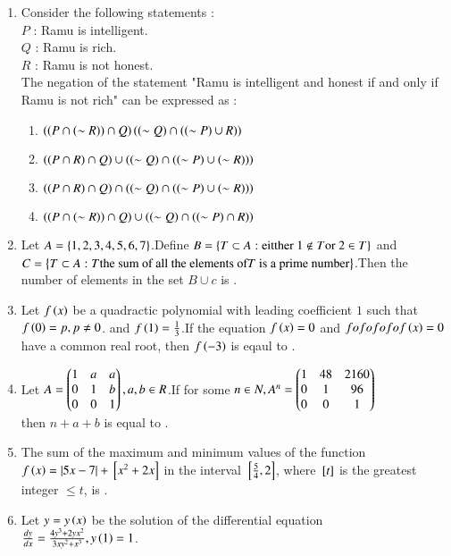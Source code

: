 \documentclass[journal,12pt,onecolumn,article]{IEEEtran}
\theoremstyle{remark}
\begin{document}
\begin{enumerate}
\item Consider the following statements : \\
$P$ : Ramu is intelligent. \\
$Q$ : Ramu is rich. \\
$R$ : Ramu is not honest.\\
The negation of the statement "Ramu is intelligent and honest if and only if Ramu is not rich" can be expressed as : 
\begin{enumerate}
\item $\left(\left(P \cap \left(\sim R\right)\right)\cap Q\right) \left(\left(\sim Q\right) \cap \left(\left(\sim P\right) \cup R\right)\right)$
\item $\left(\left(P \cap R\right) \cap Q\right) \cup\left(\left(\sim Q\right) \cap \left(\left(\sim P\right) \cup \left(\sim R\right)\right)\right)$
\item $\left(\left(P \cap R\right) \cap Q\right) \cap \left(\left(\sim Q\right) \cap \left(\left(\sim P\right) \cup \left(\sim R\right)\right)\right)$
\item $\left(\left(P \cap \left(\sim R\right)\right) \cap Q\right) \cup \left(\left(\sim Q\right) \cap \left(\left(\sim P\right) \cap R\right)\right)$
\end{enumerate}
\item Let $A = \left\{1,2,3,4,5,6,7\right\}$.Define $B = \left\{T \subset A : \text{eitther } 1 \notin T \text{or } 2 \in T\right\}$ and $C = \left\{T \subset A : T \text{the sum of all the elements of} T \text{ is a prime number}\right\}$.Then the number of elements in the set $B \cup c$ is .
\item Let $f\left(x\right)$ be a quadractic polynomial with leading coefficient $1$ such that $f\left(0\right) = p,p \neq 0$. and $f\left(1\right)=\frac{1}{3}$.If the equation $f\left(x\right)=0$ and $fo fo fo fo f\left(x\right) = 0$ have a common real root, then $f\left(-3\right)$ is eqaul to .
\item Let $A = \begin{pmatrix}1&a&a \\ 0&1&b \\ 0&0&1\end{pmatrix} ,a,b \in R$.If for some $n\in N,A^n = \begin{pmatrix}1&48&2160 \\ 0&1&96 \\ 0&0&1\end{pmatrix}$ \\
then $n+a+b$ is equal to .
\item The sum of the maximum and minimum values of the function $f\left(x\right) = |5x-7| + {}\left[x^2+2x\right]$ in the interval ${}\left[\frac{5}{4},2\right]$, where ${}\left[t\right]$ is the greatest integer $\leq t$, is .
\item Let $y=y\left(x\right)$ be the solution of the differential equation \\
$\frac{dy}{dx} = \frac{4y^3+2yx^2}{3xy^2+x^3},y\left(1\right)=1$. \\

\end{enumerate}
\end{document}
